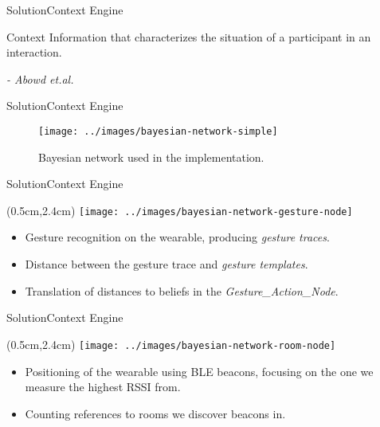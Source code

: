 \begin{frame}{Solution}{Context Engine}
\begin{block}{Context}
Information that characterizes the situation of a participant in an interaction.

\textit{- Abowd et.al.}
\end{block}
\end{frame}

\begin{frame}{Solution}{Context Engine}
\begin{figure}[h]
\centering
\texttt{[image: ../images/bayesian-network-simple]}
\caption{Bayesian network used in the implementation.}
\end{figure}
\end{frame}

\begin{frame}{Solution}{Context Engine}
\begin{textblock*}{1.5cm}(0.5cm,2.4cm)
\texttt{[image: ../images/bayesian-network-gesture-node]}
\end{textblock*}
\begin{itemize}
\item Gesture recognition on the wearable, producing \emph{gesture traces}.
\item Distance between the gesture trace and \emph{gesture templates}.
\item Translation of distances to beliefs in the \emph{Gesture\_Action\_Node}. 
\end{itemize}
\end{frame}

\begin{frame}{Solution}{Context Engine}
\begin{textblock*}{1.5cm}(0.5cm,2.4cm)
\texttt{[image: ../images/bayesian-network-room-node]}
\end{textblock*}
\begin{itemize}
\item Positioning of the wearable using BLE beacons, focusing on the one we measure the highest RSSI from.
\item Counting references to rooms we discover beacons in.
\end{itemize}
\end{frame}

